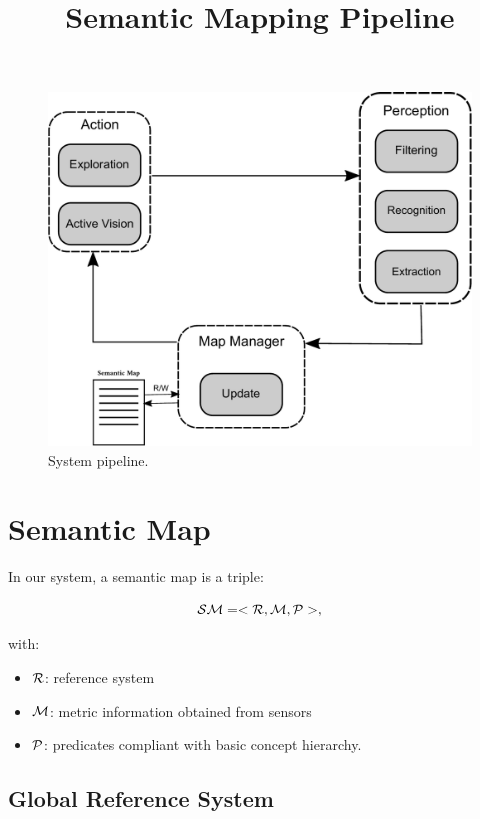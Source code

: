 \documentclass{article}
\title{\LARGE \bf Semantic Mapping Pipeline}
\begin{document}
	
	\maketitle	
	
	\begin{figure}[htbp]
		\centering
		\includegraphics[width=\linewidth]{pics/drawing-crop.pdf}
		\caption{System pipeline.}
		\label{fig:pipeline}
	\end{figure}
	
	\newpage
	\section{Semantic Map}
	
	In our system, a semantic map is a triple:
	
	\begin{equation}
		\mathcal{SM} = < \mathcal{R}, \mathcal{M}, \mathcal{P} >,
	\end{equation}
	
	\noindent
	with:
	
	\begin{itemize}
		\item $\mathcal{R}$: reference system
		\item $\mathcal{M}$: metric information obtained from sensors
		\item $\mathcal{P}$: predicates compliant with basic concept hierarchy.
	\end{itemize}
	
	\subsection{Global Reference System}	
	
\end{document}
